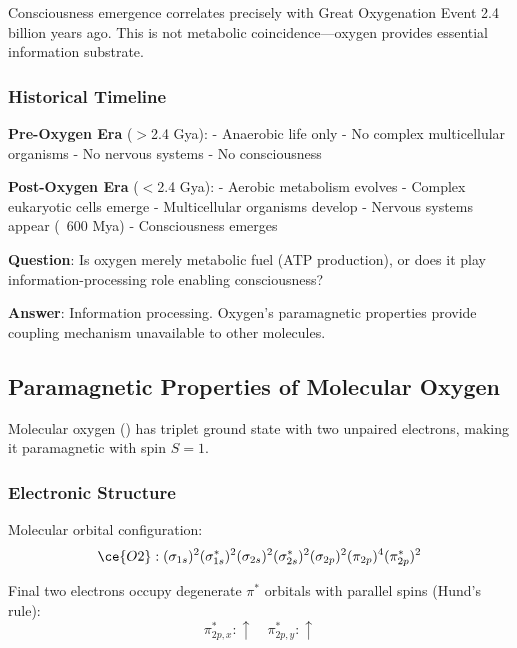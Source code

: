 \documentclass[11pt,onecolumn]{article}
\begin{document}
Consciousness emergence correlates precisely with Great Oxygenation Event 2.4 billion years ago. This is not metabolic coincidence---oxygen provides essential information substrate.

\subsubsection{Historical Timeline}

\textbf{Pre-Oxygen Era} ($>$2.4 Gya):
- Anaerobic life only
- No complex multicellular organisms
- No nervous systems
- No consciousness

\textbf{Post-Oxygen Era} ($<$2.4 Gya):
- Aerobic metabolism evolves
- Complex eukaryotic cells emerge
- Multicellular organisms develop
- Nervous systems appear (~600 Mya)
- Consciousness emerges

\textbf{Question}: Is oxygen merely metabolic fuel (ATP production), or does it play information-processing role enabling consciousness?

\textbf{Answer}: Information processing. Oxygen's paramagnetic properties provide coupling mechanism unavailable to other molecules.

\subsection{Paramagnetic Properties of Molecular Oxygen}

\begin{theorem}[O$_2$ Paramagnetism]
Molecular oxygen () has triplet ground state with two unpaired electrons, making it paramagnetic with spin $S=1$.
\end{theorem}

\subsubsection{Electronic Structure}

Molecular orbital configuration:
\begin{equation}
\ce{O2}: (\sigma_{1s})^2 (\sigma_{1s}^*)^2 (\sigma_{2s})^2 (\sigma_{2s}^*)^2 (\sigma_{2p})^2 (\pi_{2p})^4 (\pi_{2p}^*)^2
\end{equation}

Final two electrons occupy degenerate $\pi^*$ orbitals with parallel spins (Hund's rule):
\begin{equation}
\pi_{2p,x}^*: \uparrow \quad \pi_{2p,y}^*: \uparrow
\end{equation}
\end{document}
